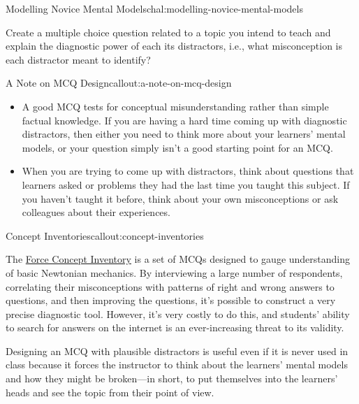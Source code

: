 \begin{challenge}{Modelling Novice Mental Models}{chal:modelling-novice-mental-models}

Create a multiple choice question related to a topic you intend to teach
and explain the diagnostic power of each its distractors, i.e., what
misconception is each distractor meant to identify?
\end{challenge}

\begin{callout}{A Note on MCQ Design}{callout:a-note-on-mcq-design}

\begin{itemize}
\item
  A good MCQ tests for conceptual misunderstanding rather than simple
  factual knowledge. If you are having a hard time coming up with
  diagnostic distractors, then either you need to think more about your
  learners' mental models, or your question simply isn't a good starting
  point for an MCQ.
\item
  When you are trying to come up with distractors, think about questions
  that learners asked or problems they had the last time you taught this
  subject. If you haven't taught it before, think about your own
  misconceptions or ask colleagues about their experiences.
\end{itemize}
\end{callout}

\begin{callout}{Concept Inventories}{callout:concept-inventories}

The \href{https://en.wikipedia.org/wiki/Force\_Concept\_Inventory}{Force
Concept Inventory} is a set of MCQs designed to gauge understanding of
basic Newtonian mechanics. By interviewing a large number of
respondents, correlating their misconceptions with patterns of right and
wrong answers to questions, and then improving the questions, it's
possible to construct a very precise diagnostic tool. However, it's very
costly to do this, and students' ability to search for answers on the
internet is an ever-increasing threat to its validity.
\end{callout}

Designing an MCQ with plausible distractors is useful even if it is
never used in class because it forces the instructor to think about the
learners' mental models and how they might be broken---in short, to put
themselves into the learners' heads and see the topic from their point
of view.

